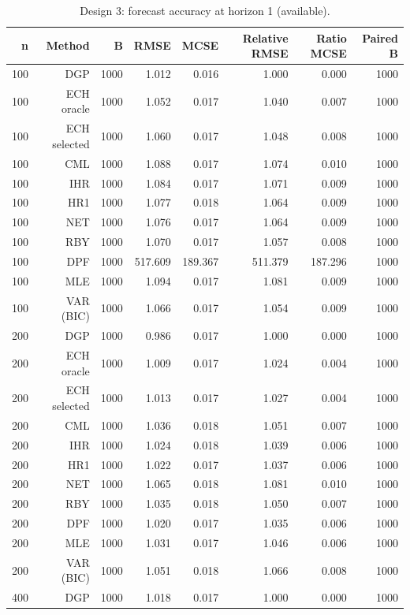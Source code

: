 \begin{table}[p]\centering
\caption{Design 3: forecast accuracy at horizon 1 (available).}
\small
\begin{tabular}{rrrrrrrr}\toprule
n & Method & B & RMSE & MCSE & Relative RMSE & Ratio MCSE & Paired B \\\midrule
100 & DGP & 1000 & 1.012 & 0.016 & 1.000 & 0.000 & 1000 \\
100 & ECH oracle & 1000 & 1.052 & 0.017 & 1.040 & 0.007 & 1000 \\
100 & ECH selected & 1000 & 1.060 & 0.017 & 1.048 & 0.008 & 1000 \\
100 & CML & 1000 & 1.088 & 0.017 & 1.074 & 0.010 & 1000 \\
100 & IHR & 1000 & 1.084 & 0.017 & 1.071 & 0.009 & 1000 \\
100 & HR1 & 1000 & 1.077 & 0.018 & 1.064 & 0.009 & 1000 \\
100 & NET & 1000 & 1.076 & 0.017 & 1.064 & 0.009 & 1000 \\
100 & RBY & 1000 & 1.070 & 0.017 & 1.057 & 0.008 & 1000 \\
100 & DPF & 1000 & 517.609 & 189.367 & 511.379 & 187.296 & 1000 \\
100 & MLE & 1000 & 1.094 & 0.017 & 1.081 & 0.009 & 1000 \\
100 & VAR (BIC) & 1000 & 1.066 & 0.017 & 1.054 & 0.009 & 1000 \\
200 & DGP & 1000 & 0.986 & 0.017 & 1.000 & 0.000 & 1000 \\
200 & ECH oracle & 1000 & 1.009 & 0.017 & 1.024 & 0.004 & 1000 \\
200 & ECH selected & 1000 & 1.013 & 0.017 & 1.027 & 0.004 & 1000 \\
200 & CML & 1000 & 1.036 & 0.018 & 1.051 & 0.007 & 1000 \\
200 & IHR & 1000 & 1.024 & 0.018 & 1.039 & 0.006 & 1000 \\
200 & HR1 & 1000 & 1.022 & 0.017 & 1.037 & 0.006 & 1000 \\
200 & NET & 1000 & 1.065 & 0.018 & 1.081 & 0.010 & 1000 \\
200 & RBY & 1000 & 1.035 & 0.018 & 1.050 & 0.007 & 1000 \\
200 & DPF & 1000 & 1.020 & 0.017 & 1.035 & 0.006 & 1000 \\
200 & MLE & 1000 & 1.031 & 0.017 & 1.046 & 0.006 & 1000 \\
200 & VAR (BIC) & 1000 & 1.051 & 0.018 & 1.066 & 0.008 & 1000 \\
400 & DGP & 1000 & 1.018 & 0.017 & 1.000 & 0.000 & 1000 \\

\end{tabular}
\end{table}
